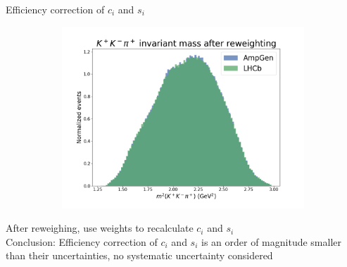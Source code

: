 \documentclass{beamer}
\begin{document}
\begin{frame}{Efficiency correction of $c_i$ and $s_i$}
\begin{figure}
\begin{subfigure}{0.33\textwidth}
      \includegraphics[width = 1.0\textwidth]{Plots/s012_AfterReweighting.png}
    \end{subfigure}
  \end{figure}
  \begin{center}
    After reweighing, use weights to recalculate $c_i$ and $s_i$ \\
    Conclusion: Efficiency correction of $c_i$ and $s_i$ is an order of magnitude smaller than their uncertainties, no systematic uncertainty considered
  \end{center}
\end{frame}
\end{document}
